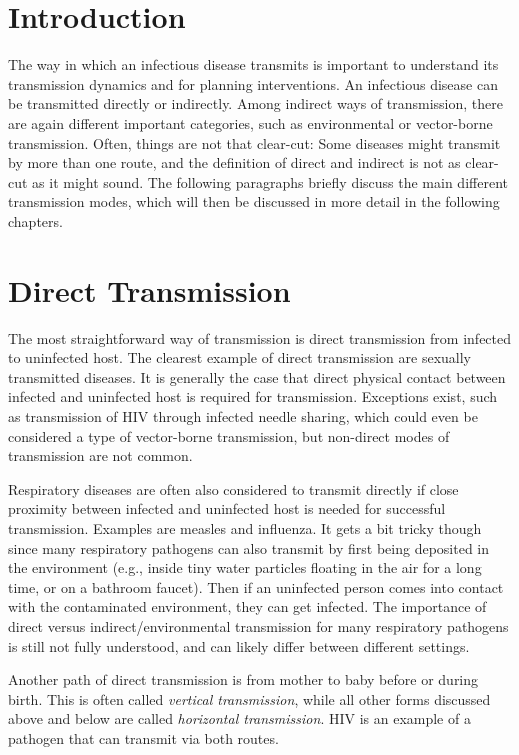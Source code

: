 \documentclass[
]{book}
\begin{document}
\hypertarget{introduction-4}{%
\section{Introduction}\label{introduction-4}}

The way in which an infectious disease transmits is important to understand its transmission dynamics and for planning interventions. An infectious disease can be transmitted directly or indirectly. Among indirect ways of transmission, there are again different important categories, such as environmental or vector-borne transmission. Often, things are not that clear-cut: Some diseases might transmit by more than one route, and the definition of direct and indirect is not as clear-cut as it might sound. The following paragraphs briefly discuss the main different transmission modes, which will then be discussed in more detail in the following chapters.

\hypertarget{direct-transmission}{%
\section{Direct Transmission}\label{direct-transmission}}

The most straightforward way of transmission is direct transmission from infected to uninfected host. The clearest example of direct transmission are sexually transmitted diseases. It is generally the case that direct physical contact between infected and uninfected host is required for transmission. Exceptions exist, such as transmission of HIV through infected needle sharing, which could even be considered a type of vector-borne transmission, but non-direct modes of transmission are not common.

Respiratory diseases are often also considered to transmit directly if close proximity between infected and uninfected host is needed for successful transmission. Examples are measles and influenza. It gets a bit tricky though since many respiratory pathogens can also transmit by first being deposited in the environment (e.g., inside tiny water particles floating in the air for a long time, or on a bathroom faucet). Then if an uninfected person comes into contact with the contaminated environment, they can get infected. The importance of direct versus indirect/environmental transmission for many respiratory pathogens is still not fully understood, and can likely differ between different settings.

Another path of direct transmission is from mother to baby before or during birth. This is often called \emph{vertical transmission}, while all other forms discussed above and below are called \emph{horizontal transmission}. HIV is an example of a pathogen that can transmit via both routes.
\end{document}
